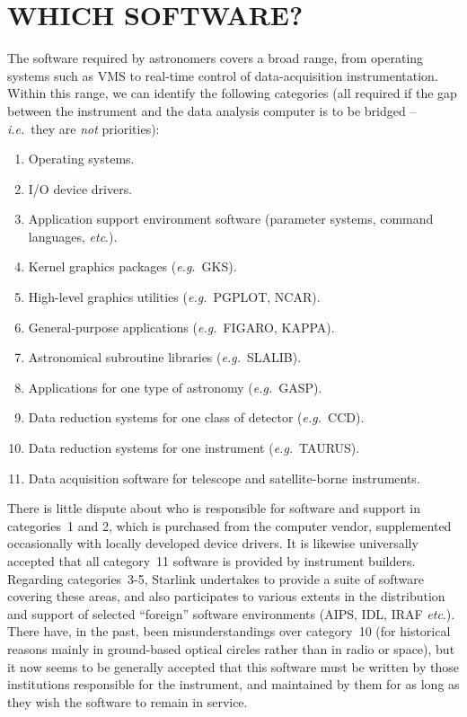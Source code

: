 \documentclass[nolof,11pt,noabs]{starlink}
\begin{document}
\section{WHICH SOFTWARE?}
The software required by astronomers covers a broad range, from
operating systems such as VMS to real-time control of
data-acquisition instrumentation.  Within this range, we
can identify the following categories (all required if the gap between
the instrument and the data analysis computer is to be bridged --
\textit{i.e.}\ they are \textit{not} priorities):
\begin{enumerate}
\item Operating systems.
\item I/O device drivers.
\item Application support environment software (parameter
      systems, command languages, \textit{etc}.).
\item Kernel graphics packages (\textit{e.g.}\ GKS).
\item High-level graphics utilities (\textit{e.g.}\ PGPLOT, NCAR).
\item General-purpose applications (\textit{e.g.}\ FIGARO, KAPPA).
\item Astronomical subroutine libraries (\textit{e.g.}\ SLALIB).
\item Applications for one type of astronomy (\textit{e.g.}\ GASP).
\item Data reduction systems for one class of detector (\textit{e.g.}\ CCD).
\item Data reduction systems for one instrument (\textit{e.g.}\ TAURUS).
\item Data acquisition software for telescope and satellite-borne
instruments.
\end{enumerate}
There is little dispute about who is
responsible for software and support in categories~1 and 2, which
is purchased from the computer
vendor, supplemented occasionally with locally developed
device drivers.  It is likewise universally accepted that all
category~11 software is provided by instrument builders.
Regarding categories~3-5, Starlink undertakes to provide a suite
of software covering these areas, and also participates to various extents in
the distribution and support of selected ``foreign'' software
environments (AIPS, IDL, IRAF \textit{etc}.).
There have, in the past, been
misunderstandings over category~10 (for historical reasons mainly
in ground-based optical circles rather than in radio or space), but
it now seems to be generally accepted that this software
must be written by those institutions
responsible for the instrument, and maintained
by them for as long as they wish the software to remain in service.
\end{document}
